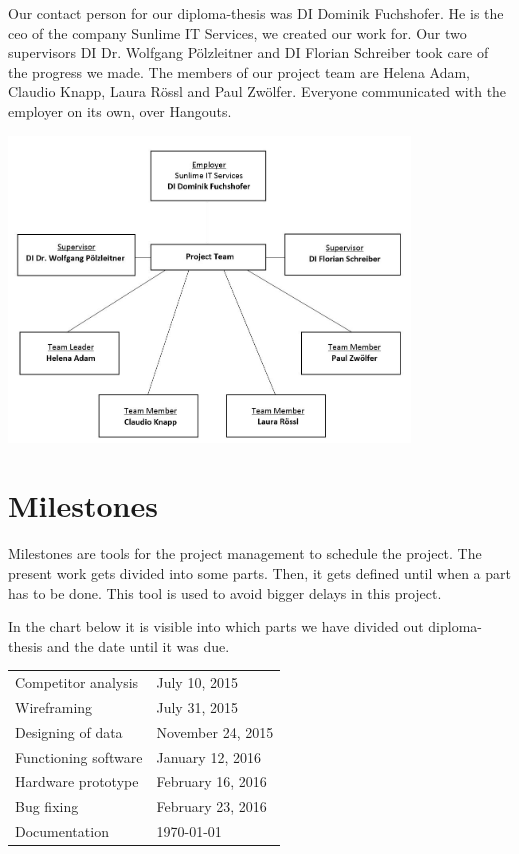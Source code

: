 Our contact person for our diploma-thesis was DI Dominik Fuchshofer. He is the \gls{ceo} of the company Sunlime IT Services, we created our work for. Our two supervisors DI Dr. Wolfgang Pölzleitner and DI Florian Schreiber took care of the progress we made. The members of our project team are Helena Adam, Claudio Knapp, Laura Rössl and Paul Zwölfer. Everyone communicated with the employer on its own, over Hangouts.
\begin{center}
\includegraphics[width=0.8\textwidth] {bilder/projectdiagram}
\end{center}
\clearpageauthor
\newpage
\section{Milestones}
Milestones are tools for the project management to schedule the project. The present work gets divided into some parts. Then, it gets defined until when a part has to be done. This tool is used to avoid bigger delays in this project.\newline

In the chart below it is visible into which parts we have divided out diploma-thesis and the date until it was due.\newline
\begin{center}
\begin{tabular}{p{5cm}p{5cm}}
\toprule
Competitor analysis & July 10, 2015 \\
Wireframing & July 31, 2015 \\
Designing of data & November 24, 2015 \\
Functioning software & January 12, 2016 \\
Hardware prototype & February 16, 2016 \\
Bug fixing & February 23, 2016 \\
Documentation & \today \\
\bottomrule
\end{tabular}
\end{center}
